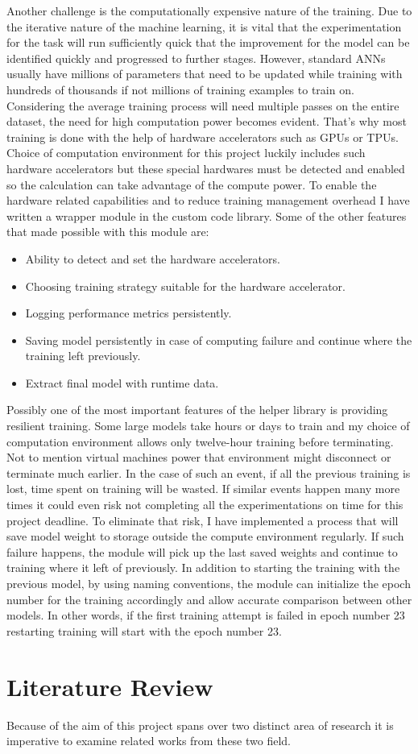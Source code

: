 Another challenge is the computationally expensive nature of the training.
Due to the iterative nature of the machine learning, it is vital that the experimentation for the task will run sufficiently quick that the improvement for the model can be identified quickly and progressed to further stages. 
However, standard ANNs usually have millions of parameters that need to be updated while training with hundreds of thousands if not millions of training examples to train on. 
Considering the average training process will need multiple passes on the entire dataset, the need for high computation power becomes evident.
That's why most training is done with the help of hardware accelerators such as GPUs or TPUs.
Choice of computation environment for this project luckily includes such hardware accelerators but these special hardwares must be detected and enabled so the calculation can take advantage of the compute power.
To enable the hardware related capabilities and to reduce training management overhead I have written a wrapper module in the custom code library.
Some of the other features that made possible with this module are:

\begin{itemize}
  \item Ability to detect and set the hardware accelerators.
  \item Choosing training strategy suitable for the hardware accelerator.
  \item Logging performance metrics persistently.
  \item Saving model persistently in case of computing failure and continue where the training left previously.
  \item Extract final model with runtime data.
\end{itemize}
 
Possibly one of the most important features of the helper library is providing resilient training. 
Some large models take hours or days to train and my choice of computation environment allows only twelve-hour training before terminating. 
Not to mention virtual machines power that environment might disconnect or terminate much earlier. 
In the case of such an event, if all the previous training is lost, time spent on training will be wasted. 
If similar events happen many more times it could even risk not completing all the experimentations on time for this project deadline. 
To eliminate that risk, I have implemented a process that will save model weight to storage outside the compute environment regularly. 
If such failure happens, the module will pick up the last saved weights and continue to training where it left of previously.
In addition to starting the training with the previous model, by using naming conventions, the module can initialize the epoch number for the training accordingly and allow accurate comparison between other models. 
In other words, if the first training attempt is failed in epoch number 23 restarting training will start with the epoch number 23.

\section{Literature Review}
Because of the aim of this project spans over two distinct area of research it is imperative to examine related works from these two field.




\clearpage